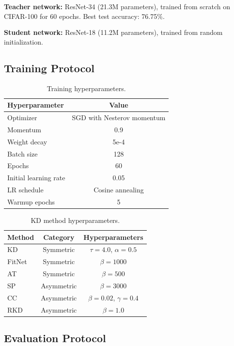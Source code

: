 \documentclass[symmetry,article,submit,pdftex,moreauthors]{Definitions/mdpi}
\begin{document}
\textbf{Teacher network:} ResNet-34 (21.3M parameters), trained from scratch on CIFAR-100 for 60 epochs. Best test accuracy: 76.75\%.

\textbf{Student network:} ResNet-18 (11.2M parameters), trained from random initialization.

\subsection{Training Protocol}

\begin{table}[H]
\caption{Training hyperparameters.\label{tab:hyperparams}}
\begin{tabularx}{\textwidth}{lC}
\toprule
\textbf{Hyperparameter} & \textbf{Value}\\
\midrule
Optimizer & SGD with Nesterov momentum\\
Momentum & 0.9\\
Weight decay & 5e-4\\
Batch size & 128\\
Epochs & 60\\
Initial learning rate & 0.05\\
LR schedule & Cosine annealing\\
Warmup epochs & 5\\
\bottomrule
\end{tabularx}
\end{table}

\begin{table}[H]
\caption{KD method hyperparameters.\label{tab:kdparams}}
\begin{tabularx}{\textwidth}{lCC}
\toprule
\textbf{Method} & \textbf{Category} & \textbf{Hyperparameters}\\
\midrule
KD~\cite{ref7} & Symmetric & $\tau=4.0$, $\alpha=0.5$\\
FitNet~\cite{ref8} & Symmetric & $\beta=1000$\\
AT~\cite{ref9} & Symmetric & $\beta=500$\\
SP~\cite{ref10} & Asymmetric & $\beta=3000$\\
CC~\cite{ref11} & Asymmetric & $\beta=0.02$, $\gamma=0.4$\\
RKD~\cite{ref12} & Asymmetric & $\beta=1.0$\\
\bottomrule
\end{tabularx}
\end{table}

\subsection{Evaluation Protocol}
\end{document}
